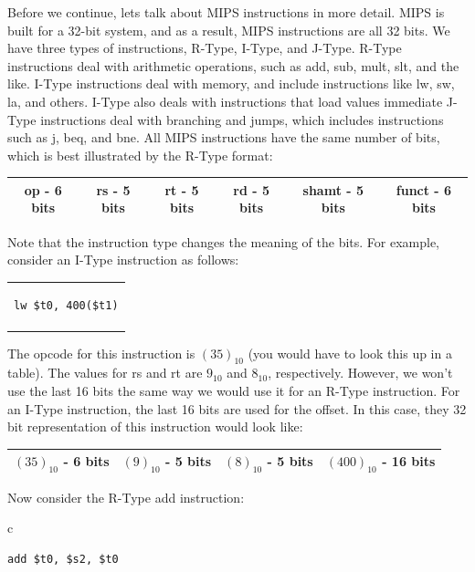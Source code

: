 \documentclass{article}
\begin{document}
\indent Before we continue, lets talk about MIPS instructions in more detail. MIPS is built for a 32-bit system, and as a result, MIPS instructions are all 32 bits. We have three types of instructions, R-Type, I-Type, and J-Type. R-Type instructions deal with arithmetic operations, such as add, sub, mult, slt, and the like. I-Type instructions deal with memory, and include instructions like lw, sw, la, and others. I-Type also deals with instructions that load values immediate J-Type instructions deal with branching and jumps, which includes instructions such as j, beq, and bne. All MIPS instructions have the same number of bits, which is best illustrated by the R-Type format:
\begin{center}
\begin{tabular}{|c|c|c|c|c|c|}
\hline
op - 6 bits & rs - 5 bits & rt - 5 bits & rd - 5 bits & shamt - 5 bits & funct - 6 bits \\ \hline
\end{tabular}
\end{center}
\noindent Note that the instruction type changes the meaning of the bits. For example, consider an I-Type instruction as follows:
\begin{center} 
\begin{tabular}{c}
\begin{lstlisting}
lw $t0, 400($t1)
\end{lstlisting}
\end{tabular}
\end{center}
\noindent The opcode for this instruction is $(35)_{10}$ (you would have to look this up in a table). The values for rs and rt are $9_{10}$ and $8_{10}$, respectively. However, we won't use the last 16 bits the same way we would use it for an R-Type instruction. For an I-Type instruction, the last 16 bits are used for the offset. In this case, they 32 bit representation of this instruction would look like:
\begin{center}
\begin{tabular}{|c|c|c|c|c|c|}
\hline
$(35)_{10}$ - 6 bits & $(9)_{10}$ - 5 bits & $(8)_{10}$ - 5 bits & \multicolumn{3}{|c|}{$(400)_{10}$  - 16 bits} \\ \hline
\end{tabular}
\end{center}
\noindent Now consider the R-Type add instruction:
\begin{center} 
\begin{tabular}{c}
\begin{lstlisting}
add $t0, $s2, $t0
\end{lstlisting}
\end{tabular}
\end{center}
\end{document}
